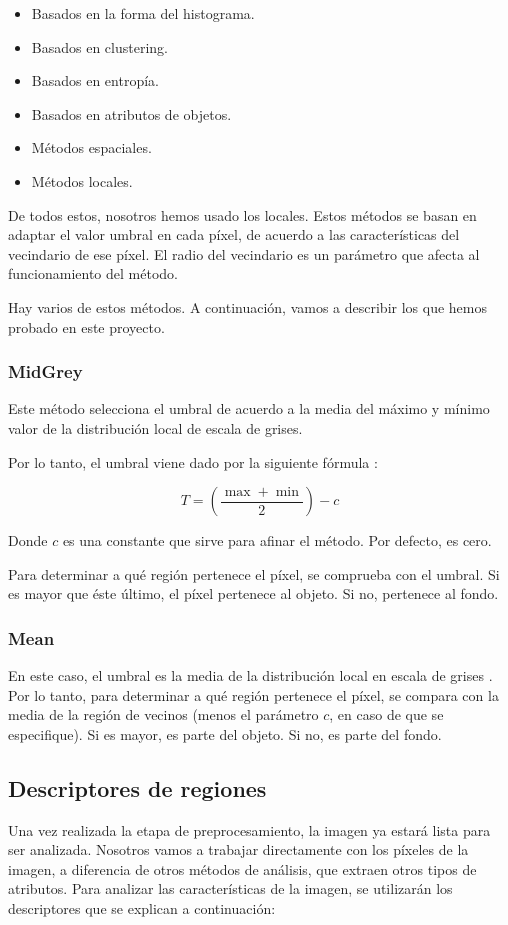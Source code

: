 \begin{itemize}
\item Basados en la forma del histograma.
\item Basados en clustering.
\item Basados en entropía.
\item Basados en atributos de objetos.
\item Métodos espaciales.
\item Métodos locales.
\end{itemize}

De todos estos, nosotros hemos usado los locales. Estos métodos se basan en adaptar el valor umbral en cada píxel, de acuerdo a las características del vecindario de ese píxel. El radio del vecindario es un parámetro que afecta al funcionamiento del método.

Hay varios de estos métodos. A continuación, vamos a describir los que hemos probado en este proyecto.

\subsubsection{MidGrey}
Este método selecciona el umbral de acuerdo a la media del máximo y mínimo valor de la distribución local de escala de grises.

Por lo tanto, el umbral viene dado por la siguiente fórmula \cite{autolocal}:

\[T = \left(\frac{\max+\min}{2}\right)-c\]

Donde $c$ es una constante que sirve para afinar el método. Por defecto, es cero.

Para determinar a qué región pertenece el píxel, se comprueba con el umbral. Si es mayor que éste último, el píxel pertenece al objeto. Si no, pertenece al fondo.

\subsubsection{Mean}
En este caso, el umbral es la media de la distribución local en escala de grises \cite{autolocal}. Por lo tanto, para determinar a qué región pertenece el píxel, se compara con la media de la región de vecinos (menos el parámetro $c$, en caso de que se especifique). Si es mayor, es parte del objeto. Si no, es parte del fondo.


\subsection{Descriptores de regiones}\label{descriptores}
Una vez realizada la etapa de preprocesamiento, la imagen ya estará lista para ser analizada.
Nosotros vamos a trabajar directamente con los píxeles de la imagen, a diferencia de otros métodos de análisis, que extraen otros tipos de atributos. Para analizar las características de la imagen, se utilizarán los descriptores que se explican a continuación:

